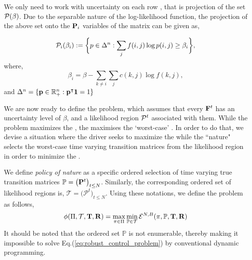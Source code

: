 We only need to work with uncertainty on each row {\truetransitionmatrix}, that is projection of the set $\mathcal{P}(\beta)$. Due to the separable nature of the log-likelihood function, the projection of the above set onto the ${\mathbf{P}}_i$ variables of the matrix {\truetransitionmatrix} can be given as,

\begin{equation*}
\mathcal{P}_i(\beta_i) := \bigg\{p \in \Delta^n : \sum_{j}f(i,j)\log{p(i,j)} \geq \beta_i \bigg\},
\end{equation*}
where,
\begin{equation*}
\beta_i = \beta - \sum_{k \neq i}\sum_{j}c(k,j)\log{f(k,j)},
\end{equation*}
and  $\Delta^n = \{\mathbf{p} \in \mathbb{R}^n_+ : \mathbf{p}^\intercal \mathbf{1} = 1 \}$

 We are now ready to define the {\robustproblem}
problem, which assumes that every ${{\mathbf{F}}}^t$ has an uncertainty level of $\beta$, and a likelihood region $\mathcal{P}^t$ associated with them. While the {\theproblem} problem maximizes the {\totalexpectedearnings}, the {\nominalproblem} maximises the `worst-case' {\totalexpectedearnings}. In order to do that, we devise a situation where the driver seeks to maximize the {\totalexpectedearnings} 
while the ``nature" selects the worst-case time varying transition matrices from the likelihood region {\likelihoodregion} in order to minimize the {\totalexpectedearnings}.

We define \textit{policy of nature} as a specific ordered selection of time varying true transition matrices 
$\mathbb{P} = \big( {\mathbf{P}}^t \big)_{t \leq N}$.
Similarly, the corresponding ordered set of likelihood regions is,
$\mathcal{T} = \big(\mathcal{P}^t \big)_{t \leq N}$. 
Using these notations, we define the {\robustproblem} problem as follows,
\begin{equation}
\label{eq:robust_control_problem}
\phi(\Pi, \mathcal{T}, {\mathbf{T}}, {\mathbf{R}}) = \max_{\pi \in \Pi} \min_{\mathbb{P} \in \mathcal{T}} \mathcal{E}^{N,B}(\pi, \mathbb{P}, {\mathbf{T}}, {\mathbf{R}}) \\
\end{equation}
It should be noted that the ordered set $\mathbb{P}$ is not enumerable, thereby making it impossible to solve Eq.(\ref{eq:robust_control_problem}) by conventional dynamic programming.

